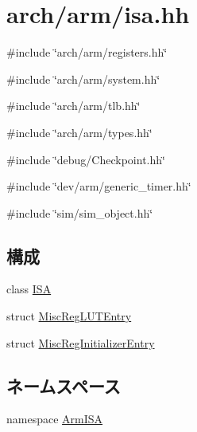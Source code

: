 \hypertarget{arm_2isa_8hh}{
\section{arch/arm/isa.hh}
\label{arm_2isa_8hh}
}
{\ttfamily \#include \char`\"{}arch/arm/registers.hh\char`\"{}}\par
{\ttfamily \#include \char`\"{}arch/arm/system.hh\char`\"{}}\par
{\ttfamily \#include \char`\"{}arch/arm/tlb.hh\char`\"{}}\par
{\ttfamily \#include \char`\"{}arch/arm/types.hh\char`\"{}}\par
{\ttfamily \#include \char`\"{}debug/Checkpoint.hh\char`\"{}}\par
{\ttfamily \#include \char`\"{}dev/arm/generic\_\-timer.hh\char`\"{}}\par
{\ttfamily \#include \char`\"{}sim/sim\_\-object.hh\char`\"{}}\par
\subsection*{構成}
\begin{DoxyCompactItemize}
\item 
class \hyperlink{structArmISA_1_1ISA}{ISA}
\item 
struct \hyperlink{structArmISA_1_1ISA_1_1MiscRegLUTEntry}{MiscRegLUTEntry}
\item 
struct \hyperlink{structArmISA_1_1ISA_1_1MiscRegInitializerEntry}{MiscRegInitializerEntry}
\end{DoxyCompactItemize}
\subsection*{ネームスペース}
\begin{DoxyCompactItemize}
\item 
namespace \hyperlink{namespaceArmISA}{ArmISA}
\end{DoxyCompactItemize}
